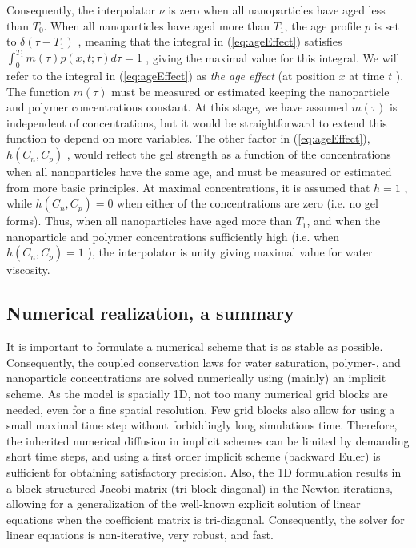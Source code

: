 \documentclass[journal = enfuem, manuscript =  article]{achemso}
\begin{document}
Consequently, the interpolator  $\nu$ is zero when all nanoparticles have aged less than  $T_0$. When all nanoparticles have aged more than  $T_1$, the age profile $p$ is set to  $\delta(\tau-T_1)$ , meaning that the integral in (\ref{eq:ageEffect}) satisfies $\int^{T_1}_{0}m(\tau)p(x,t;\tau)d\tau=1$ , giving the maximal value for this integral. We will refer to the integral in (\ref{eq:ageEffect})  as \textit{the age effect} (at position $x$ at time $t$ ). The function $m(\tau)$ must be measured or estimated keeping the nanoparticle and polymer concentrations constant. At this stage, we have assumed  $m(\tau)$ is independent of concentrations, but it would be straightforward to extend this function to depend on more variables. The other factor in (\ref{eq:ageEffect}), $h(C_n,C_p)$ , would reflect the gel strength as a function of the concentrations when all nanoparticles have the same age, and must be measured or estimated from more basic principles. At maximal concentrations, it is assumed that $h=1$ , while $h(C_n,C_p)=0$ when either of the concentrations are zero (i.e. no gel forms). Thus, when all nanoparticles have aged more than $T_1$, and when the nanoparticle and polymer concentrations sufficiently high (i.e. when $h(C_n,C_p)=1$ ), the interpolator is unity giving maximal value for water viscosity.

\subsection{Numerical realization, a summary}
It is important to formulate a numerical scheme that is as stable as possible. Consequently, the coupled conservation laws for water saturation, polymer-, and nanoparticle concentrations are solved numerically using (mainly) an implicit scheme. As the model is spatially 1D, not too many numerical grid blocks are needed, even for a fine spatial resolution. Few grid blocks also allow for using a small maximal time step without forbiddingly long simulations time. Therefore, the inherited numerical diffusion in implicit schemes can be limited by demanding short time steps, and using a first order implicit scheme (backward Euler) is sufficient for obtaining satisfactory precision. Also, the 1D formulation results in a block structured Jacobi matrix (tri-block diagonal) in the Newton iterations, allowing for a generalization of the well-known explicit solution of linear equations when the coefficient matrix is tri-diagonal. Consequently, the solver for linear equations is non-iterative, very robust, and fast. 
\end{document}
